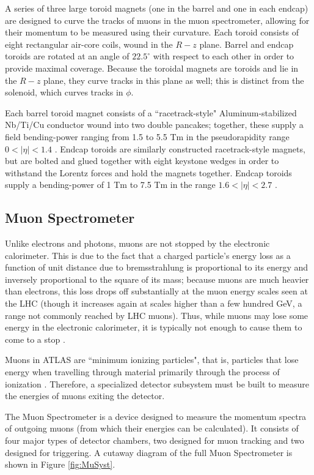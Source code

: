 A series of three large toroid magnets (one in the barrel and one in each endcap) are designed to curve the tracks of muons in the muon spectrometer, allowing for their momentum to be measured using their curvature. Each toroid consists of eight rectangular air-core coils, wound in the $R - z$ plane. Barrel and endcap toroids are rotated at an angle of $22.5 ^{\circ}$ with respect to each other in order to provide maximal coverage. Because the toroidal magnets are toroids and lie in the $R - z$ plane, they curve tracks in this plane as well; this is distinct from the solenoid, which curves tracks in $\phi$.

Each barrel toroid magnet consists of a ``racetrack-style" Aluminum-stabilized Nb/Ti/Cu conductor wound into two double pancakes; together, these supply a field bending-power ranging from 1.5 to 5.5 Tm  in the pseudorapidity range  $0 < |\eta | < 1.4$ \cite{Coldmass}. Endcap toroids are similarly constructed racetrack-style magnets, but are bolted and glued together with eight keystone wedges in order to withstand the Lorentz forces and hold the magnets together. Endcap toroids supply a bending-power of 1 Tm to 7.5 Tm in the range $ 1.6 < |\eta | < 2.7 $ \cite{Toroid} \cite{Magnets}.

\subsection{Muon Spectrometer} \label{sec:Musyst}
 
Unlike electrons and photons, muons are not stopped by the electronic calorimeter. This is due to the fact that a charged particle's energy loss as a function of unit distance due to bremsstrahlung is proportional to its energy and inversely proportional to the square of its mass; because muons are much heavier than electrons, this loss drops off substantially at the muon energy scales seen at the LHC (though it increases again at scales higher than a few hundred GeV, a range not commonly reached by LHC muons). Thus, while muons may lose some energy in the electronic calorimeter, it is typically not enough to cause them to come to a stop \cite{Stopping}. 

Muons in ATLAS are ``minimum ionizing particles", that is, particles that lose energy when travelling through material primarily through the process of ionization \cite{PDG}. Therefore, a specialized detector subsystem must be built to measure the energies of muons exiting the detector.

The Muon Spectrometer is a device designed to measure the momentum spectra of outgoing muons (from which their energies can be calculated). It consists of four major types of detector chambers, two designed for muon tracking and two designed for triggering. A cutaway diagram of the full Muon Spectrometer is shown in Figure \ref{fig:MuSyst}.

